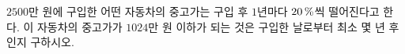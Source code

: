 $2500$만 원에 구입한 어떤 자동차의 중고가는 구입 후 $1$년마다 $20\mkern3mu \%$씩 떨어진다고 한다. 이 자동차의 중고가가 $1024$만 원 이하가 되는 것은 구입한 날로부터 최소 몇 년 후인지 구하시오.
